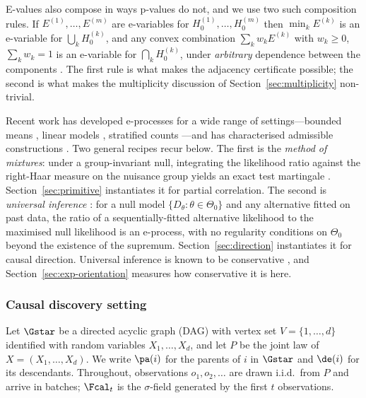 E-values also compose in ways p-values do not, and we use two such
composition rules. If $E^{(1)}, \dots, E^{(m)}$ are e-variables for
$H_0^{(1)}, \dots, H_0^{(m)}$ then $\min_k E^{(k)}$ is an e-variable for
$\bigcup_k H_0^{(k)}$, and any convex combination $\sum_k w_k E^{(k)}$ with
$w_k \ge 0$, $\sum_k w_k = 1$ is an e-variable for $\bigcap_k H_0^{(k)}$,
under \emph{arbitrary} dependence between the components
\citep{vovk2021evalues}. The first rule is what makes the adjacency
certificate possible; the second is what makes the multiplicity discussion of
Section~\ref{sec:multiplicity} non-trivial.

Recent work has developed e-processes for a wide range of settings---bounded
means \citep{waudbysmith2024estimating}, linear models
\citep{lindon2026anytime}, stratified counts \citep{turner2023safe}---and has
characterised admissible constructions \citep{ramdas2023gametheoretic}. Two
general recipes recur below. The first is the \emph{method of mixtures}: under
a group-invariant null, integrating the likelihood ratio against the right-Haar
measure on the nuisance group yields an exact test martingale
\citep{berger1998bayes,hendriksen2021optional,grunwald2024safe}.
Section~\ref{sec:primitive} instantiates it for partial correlation. The second
is \emph{universal inference} \citep{wasserman2020universal}: for a null model
$\{D_\theta : \theta \in \Theta_0\}$ and any alternative fitted on past data,
the ratio of a sequentially-fitted alternative likelihood to the maximised null
likelihood is an e-process, with no regularity conditions on $\Theta_0$ beyond
the existence of the supremum. Section~\ref{sec:direction} instantiates it for
causal direction. Universal inference is known to be conservative
\citep{tse2022note}, and Section~\ref{sec:exp-orientation} measures how
conservative it is here.

\subsubsection{Causal discovery setting}\label{sec:setting}

Let $\Gstar$ be a directed acyclic graph (DAG) with vertex set
$V = \{1,\dots,d\}$ identified with random variables $X_1,\dots,X_d$, and let
$P$ be the joint law of $X = (X_1,\dots,X_d)$. We write $\pa(i)$ for the
parents of $i$ in $\Gstar$ and $\de(i)$ for its descendants. Throughout,
observations $o_1, o_2, \dots$ are drawn i.i.d.\ from $P$ and arrive in
batches; $\Fcal_t$ is the $\sigma$-field generated by the first $t$
observations.

